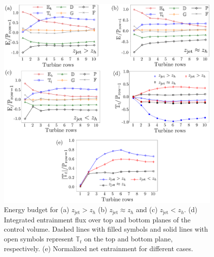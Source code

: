 \documentclass[%
 aip,
 amsmath,amssymb,
reprint,
twocolumn,%
author-numerical,%
]{revtex4-1}
\begin{document}
{{\begin{figure}[ht!]
	\centering
	\includegraphics[width=0.85\linewidth]{fig7}
	\caption{Energy budget for (a) $ z_\text{jet} > z_h$ (b) $ z_\text{jet} \approx z_h$ and (c) $ z_\text{jet} < z_h$. (d) Integrated entrainment flux over top and bottom planes of the control volume. Dashed lines with filled symbols  and solid lines with open symbols represent $\mathbb{T}_t$ on the top and bottom plane, respectively. (e) Normalized net entrainment for different cases.}
	\label{energybudget}
\end{figure}


}}
\end{document}
